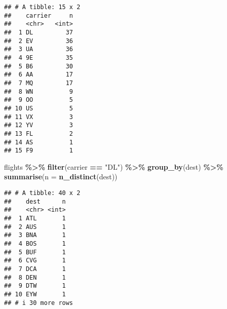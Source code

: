\documentclass[
]{article}
\newenvironment{Shaded}{\begin{snugshade}}{\end{snugshade}}
\newcommand{\AttributeTok}[1]{\textcolor[rgb]{0.13,0.29,0.53}{#1}}
\newcommand{\FunctionTok}[1]{\textcolor[rgb]{0.13,0.29,0.53}{\textbf{#1}}}
\newcommand{\NormalTok}[1]{#1}
\newcommand{\SpecialCharTok}[1]{\textcolor[rgb]{0.81,0.36,0.00}{\textbf{#1}}}
\newcommand{\StringTok}[1]{\textcolor[rgb]{0.31,0.60,0.02}{#1}}
\begin{document}
\begin{verbatim}
## # A tibble: 15 x 2
##    carrier     n
##    <chr>   <int>
##  1 DL         37
##  2 EV         36
##  3 UA         36
##  4 9E         35
##  5 B6         30
##  6 AA         17
##  7 MQ         17
##  8 WN          9
##  9 OO          5
## 10 US          5
## 11 VX          3
## 12 YV          3
## 13 FL          2
## 14 AS          1
## 15 F9          1
\end{verbatim}

\begin{Shaded}
\begin{Highlighting}[]
\NormalTok{flights }\SpecialCharTok{\%\textgreater{}\%}
  \FunctionTok{filter}\NormalTok{(carrier }\SpecialCharTok{==} \StringTok{"DL"}\NormalTok{) }\SpecialCharTok{\%\textgreater{}\%}
  \FunctionTok{group\_by}\NormalTok{(dest) }\SpecialCharTok{\%\textgreater{}\%}
  \FunctionTok{summarise}\NormalTok{(}\AttributeTok{n =} \FunctionTok{n\_distinct}\NormalTok{(dest)) }
\end{Highlighting}
\end{Shaded}

\begin{verbatim}
## # A tibble: 40 x 2
##    dest      n
##    <chr> <int>
##  1 ATL       1
##  2 AUS       1
##  3 BNA       1
##  4 BOS       1
##  5 BUF       1
##  6 CVG       1
##  7 DCA       1
##  8 DEN       1
##  9 DTW       1
## 10 EYW       1
## # i 30 more rows
\end{verbatim}
\end{document}
